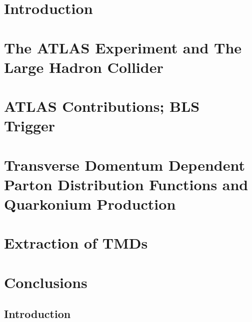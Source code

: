 \documentclass[twoside,12pt, a4paper]{report}
\begin{document}




\clearpage



\clearpage



\clearpage



\clearpage



\clearpage

\tableofcontents

\clearpage

\listoftables

\clearpage

\listoffigures

\clearpage


\pagestyle{main}

\chapter{Introduction}


\chapter{The ATLAS Experiment and The Large Hadron Collider}

\chapter{ATLAS Contributions; BLS Trigger}

\chapter{Transverse Domentum Dependent Parton Distribution Functions and Quarkonium Production}

\chapter{Extraction of TMDs}

\chapter{Conclusions}


\begin{appendices}

\chapter{Introduction}
\label{appendix_introduction}


\end{appendices}

\clearpage %
\printbibliography[heading=bibintoc,title=References]
\end{document}
